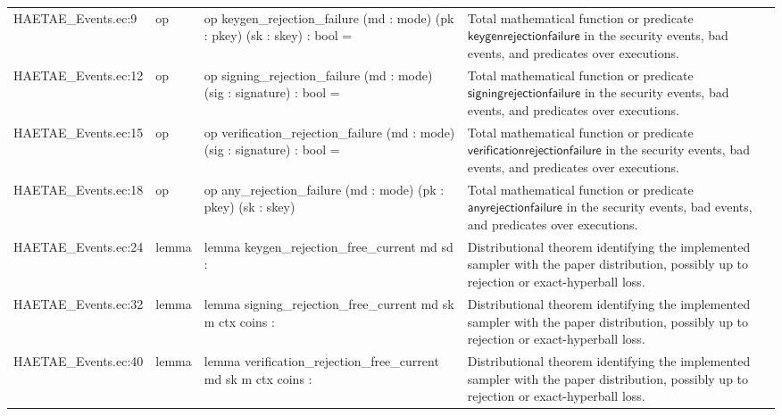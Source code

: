 \documentclass[10pt]{article}
\begin{document}
\begin{longtable}{L{0.11\textwidth}L{0.055\textwidth}L{0.385\textwidth}L{0.41\textwidth}}
HAETAE\_\allowbreak{}Events.\allowbreak{}ec:\allowbreak{}9 & op & {\ttfamily\scriptsize op keygen\_\allowbreak{}rejection\_\allowbreak{}failure (md : mode) (pk : pkey) (sk : skey) : bool =} & Total mathematical function or predicate $\mathsf{keygenrejectionfailure}$ in the security events, bad events, and predicates over executions. \\
HAETAE\_\allowbreak{}Events.\allowbreak{}ec:\allowbreak{}12 & op & {\ttfamily\scriptsize op signing\_\allowbreak{}rejection\_\allowbreak{}failure (md : mode) (sig : signature) : bool =} & Total mathematical function or predicate $\mathsf{signingrejectionfailure}$ in the security events, bad events, and predicates over executions. \\
HAETAE\_\allowbreak{}Events.\allowbreak{}ec:\allowbreak{}15 & op & {\ttfamily\scriptsize op verification\_\allowbreak{}rejection\_\allowbreak{}failure (md : mode) (sig : signature) : bool =} & Total mathematical function or predicate $\mathsf{verificationrejectionfailure}$ in the security events, bad events, and predicates over executions. \\
HAETAE\_\allowbreak{}Events.\allowbreak{}ec:\allowbreak{}18 & op & {\ttfamily\scriptsize op any\_\allowbreak{}rejection\_\allowbreak{}failure (md : mode) (pk : pkey) (sk : skey)} & Total mathematical function or predicate $\mathsf{anyrejectionfailure}$ in the security events, bad events, and predicates over executions. \\
HAETAE\_\allowbreak{}Events.\allowbreak{}ec:\allowbreak{}24 & lemma & {\ttfamily\scriptsize lemma keygen\_\allowbreak{}rejection\_\allowbreak{}free\_\allowbreak{}current md sd :} & Distributional theorem identifying the implemented sampler with the paper distribution, possibly up to rejection or exact-hyperball loss. \\
HAETAE\_\allowbreak{}Events.\allowbreak{}ec:\allowbreak{}32 & lemma & {\ttfamily\scriptsize lemma signing\_\allowbreak{}rejection\_\allowbreak{}free\_\allowbreak{}current md sk m ctx coins :} & Distributional theorem identifying the implemented sampler with the paper distribution, possibly up to rejection or exact-hyperball loss. \\
HAETAE\_\allowbreak{}Events.\allowbreak{}ec:\allowbreak{}40 & lemma & {\ttfamily\scriptsize lemma verification\_\allowbreak{}rejection\_\allowbreak{}free\_\allowbreak{}current md sk m ctx coins :} & Distributional theorem identifying the implemented sampler with the paper distribution, possibly up to rejection or exact-hyperball loss. \\

\end{longtable}
\end{document}
